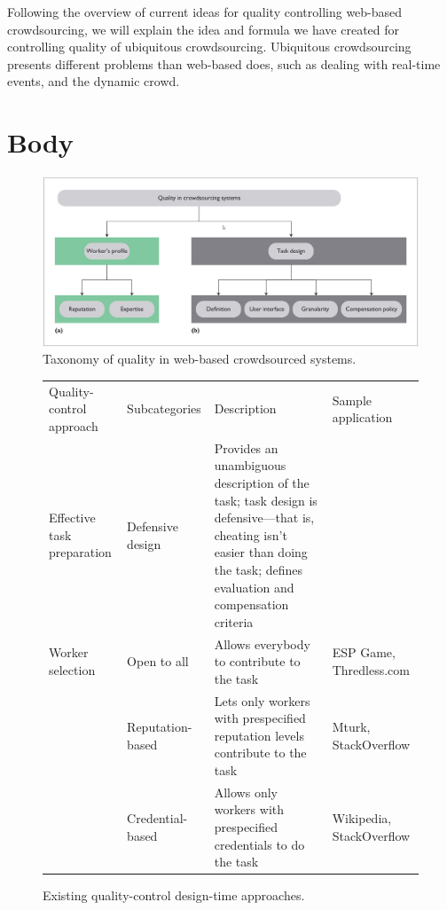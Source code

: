 \documentclass[9pt,twocolumn]{article}
\begin{document}
	Following the overview of current ideas for quality controlling web-based crowdsourcing, we will explain the idea and formula we have created for controlling quality of ubiquitous crowdsourcing. Ubiquitous crowdsourcing presents different problems than web-based does, such as dealing with real-time events, and the dynamic crowd. 
	
	\section*{Body}
	
	
	
	\begin{figure}
		\label{fig-taxonomy}
		\includegraphics[width=\textwidth]{taxonomy}
		\caption{Taxonomy of quality in web-based crowdsourced systems.}
	\end{figure}
	
	\begin{figure}
	\label{fig-tbl1}
	\caption{Existing quality-control design-time approaches.}
	\begin{tabularx}{\textwidth}{||XlXl|}		
		\rowcolor{gray!50}
		\hline
		Quality-control approach & Subcategories & Description & Sample application\\
		Effective task preparation & Defensive design & Provides an unambiguous description of the task;
		task design is defensive---that is, cheating isn't easier than doing the task; defines evaluation and compensation criteria
		&  \\
		Worker selection & Open to all & Allows everybody to contribute to the task & ESP Game, Thredless.com \\
										  & Reputation-based & Lets only workers with prespecified reputation levels contribute to the task & Mturk, StackOverflow \\
										  & Credential-based & Allows only workers with prespecified credentials to do the task & Wikipedia, StackOverflow \\ \hline
	\end{tabularx}
	\end{figure}
	
\end{document}
